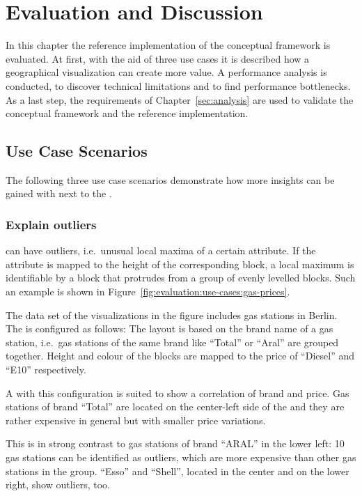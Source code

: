 \chapter{Evaluation and Discussion}\label{sec:evaluation}

In this chapter the reference implementation of the conceptual framework is evaluated.
At first, with the aid of three use cases it is described how a geographical visualization can create more value.
A performance analysis is conducted, to discover technical limitations and to find performance bottlenecks.
As a last step, the requirements of Chapter~\ref{sec:analysis} are used to validate the conceptual framework and the reference implementation.

\section{Use Case Scenarios}\label{sec:evaluation:use-cases}

The following three use case scenarios demonstrate how more insights can be gained with \gv{} next to the \tmap{}.

\subsection{Explain outliers}\label{sec:evaluation:use-cases:gas-stations}

\tmaps{} can have outliers, i.e.\ unusual local maxima of a certain attribute.
If the attribute is mapped to the height of the corresponding block, a local maximum is identifiable by a block that protrudes from a group of evenly levelled blocks.
Such an example is shown in Figure~\ref{fig:evaluation:use-cases:gas-prices}.

The data set of the visualizations in the figure includes gas stations in Berlin.
The \tmap{} is configured as follows:
The layout is based on the brand name of a gas station, i.e.\ gas stations of the same brand like ``Total'' or ``Aral'' are grouped together.
Height and colour of the blocks are mapped to the price of ``Diesel'' and ``E10'' respectively.

A \tmap{} with this configuration is suited to show a correlation of brand and price.
Gas stations of brand ``Total'' are located on the center-left side of the \tmap{} and they are rather expensive in general but with smaller price variations.

This is in strong contrast to gas stations of brand ``ARAL'' in the lower left:
10 gas stations can be identified as outliers, which are more expensive than other gas stations in the group.
``Esso'' and ``Shell'', located in the center and on the lower right, show outliers, too.

